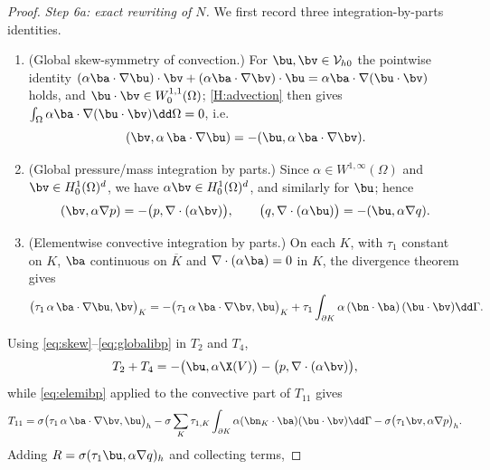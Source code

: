 \begin{proof}
\smallskip\noindent\emph{Step 6a: exact rewriting of $N$.}
We first record three integration-by-parts identities.
\begin{enumerate}[label=\textup{(\roman*)},leftmargin=2.6em]
\item (Global skew-symmetry of convection.) For $\bu,\bv\in\mathcal{V}_{h0}$ the
pointwise identity
$(\alpha\ba\cdot\nabla\bu)\cdot\bv+(\alpha\ba\cdot\nabla\bv)\cdot\bu
=\alpha\ba\cdot\nabla(\bu\cdot\bv)$ holds, and $\bu\cdot\bv\in W^{1,1}_0(\Omega)$;
\cref{H:advection} then gives $\int_\Omega\alpha\ba\cdot\nabla(\bu\cdot\bv)\dd\Omega=0$,
i.e.
\begin{equation}\label{eq:skew}
  (\bv,\alpha\,\ba\cdot\nabla\bu) = -(\bu,\alpha\,\ba\cdot\nabla\bv).
\end{equation}
\item (Global pressure/mass integration by parts.) Since
$\alpha\in W^{1,\infty}(\Omega)$ and $\bv\in H^1_0(\Omega)^d$, we have
$\alpha\bv\in H^1_0(\Omega)^d$, and similarly for $\bu$; hence
\begin{equation}\label{eq:globalibp}
  (\bv,\alpha\nabla p) = -\bigl(p,\nabla\cdot(\alpha\bv)\bigr),
  \qquad
  \bigl(q,\nabla\cdot(\alpha\bu)\bigr) = -(\bu,\alpha\nabla q).
\end{equation}
\item (Elementwise convective integration by parts.) On each $K$, with $\tau_1$ constant
on $K$, $\ba$ continuous on $\overline{K}$ and $\nabla\cdot(\alpha\ba)=0$ in $K$, the
divergence theorem gives
\begin{equation}\label{eq:elemibp}
  \bigl(\tau_1\,\alpha\,\ba\cdot\nabla\bu,\bv\bigr)_K
  = -\bigl(\tau_1\,\alpha\,\ba\cdot\nabla\bv,\bu\bigr)_K
  + \tau_{1}\int_{\partial K}\alpha\,(\bn\cdot\ba)\,(\bu\cdot\bv)\dd\Gamma .
\end{equation}
\end{enumerate}
Using \eqref{eq:skew}--\eqref{eq:globalibp} in $T_2$ and $T_4$,
\begin{equation*}
  T_2 + T_4 = -\bigl(\bu,\alpha\X(V)\bigr) - \bigl(p,\nabla\cdot(\alpha\bv)\bigr),
\end{equation*}
while \eqref{eq:elemibp} applied to the convective part of $T_{11}$ gives
\begin{equation*}
  T_{11}
  = \sigma\bigl(\tau_1\,\alpha\,\ba\cdot\nabla\bv,\bu\bigr)_h
  - \sigma\sum_{K}\tau_{1,K}\int_{\partial K}\alpha(\bn_K\cdot\ba)(\bu\cdot\bv)\dd\Gamma
  - \sigma\bigl(\tau_1\bv,\alpha\nabla p\bigr)_h .
\end{equation*}
Adding $R=\sigma(\tau_1\bu,\alpha\nabla q)_h$ and collecting terms,

\end{proof}
